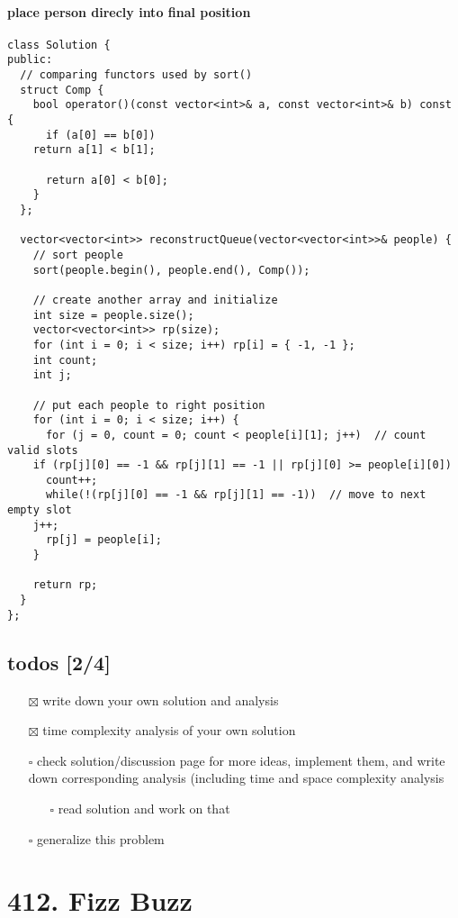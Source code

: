 \documentclass[12pt]{article}
\begin{document}
\paragraph{place person direcly into final position}
\label{sec:org679020b}
\begin{verbatim}
class Solution {
public:
  // comparing functors used by sort()
  struct Comp {
    bool operator()(const vector<int>& a, const vector<int>& b) const {
      if (a[0] == b[0])
	return a[1] < b[1];

      return a[0] < b[0];
    }
  };

  vector<vector<int>> reconstructQueue(vector<vector<int>>& people) {
    // sort people 
    sort(people.begin(), people.end(), Comp());

    // create another array and initialize
    int size = people.size();
    vector<vector<int>> rp(size);
    for (int i = 0; i < size; i++) rp[i] = { -1, -1 };
    int count;
    int j;

    // put each people to right position
    for (int i = 0; i < size; i++) {
      for (j = 0, count = 0; count < people[i][1]; j++)  // count valid slots
	if (rp[j][0] == -1 && rp[j][1] == -1 || rp[j][0] >= people[i][0])
	  count++;
      while(!(rp[j][0] == -1 && rp[j][1] == -1))  // move to next empty slot
	j++;
      rp[j] = people[i];
    }

    return rp;
  }
};
\end{verbatim}
\subsection{todos [2/4]}
\label{sec:org413053a}
\begin{itemize}
\item[{$\boxtimes$}] write down your own solution and analysis
\item[{$\boxtimes$}] time complexity analysis of your own solution
\item[{$\square$}] check solution/discussion page for more ideas, implement them, and write down corresponding analysis (including time and space complexity analysis
\begin{itemize}
\item[{$\square$}] read solution and work on that
\end{itemize}
\item[{$\square$}] generalize this problem
\end{itemize}
\section{412. Fizz Buzz}
\label{sec:orgf2b6037}
\end{document}
